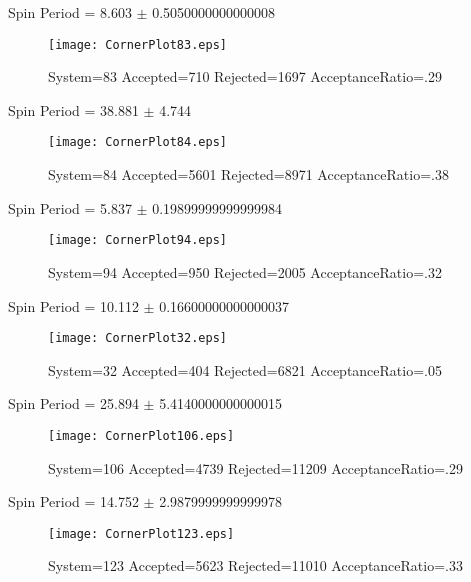 \documentclass[10pt]{article}
\begin{document}
\newpage
\begin{center}
        Spin Period = 8.603 $\pm$ 0.5050000000000008
        \end{center}
\begin{figure}[H] 
        \texttt{[image: CornerPlot83.eps]}
        \caption{System=83 Accepted=710 Rejected=1697 AcceptanceRatio=.29}
        \label{S83}
        \centering
        \end{figure}
\newpage
\begin{center}
        Spin Period = 38.881 $\pm$ 4.744
        \end{center}
\begin{figure}[H] 
        \texttt{[image: CornerPlot84.eps]}
        \caption{System=84 Accepted=5601 Rejected=8971 AcceptanceRatio=.38}
        \label{S84}
        \centering
        \end{figure}
\newpage
\begin{center}
        Spin Period = 5.837 $\pm$ 0.19899999999999984
        \end{center}
\begin{figure}[H] 
        \texttt{[image: CornerPlot94.eps]}
        \caption{System=94 Accepted=950 Rejected=2005 AcceptanceRatio=.32}
        \label{S94}
        \centering
        \end{figure}
\newpage
\begin{center}
        Spin Period = 10.112 $\pm$ 0.16600000000000037
        \end{center}
\begin{figure}[H] 
        \texttt{[image: CornerPlot32.eps]}
        \caption{System=32 Accepted=404 Rejected=6821 AcceptanceRatio=.05}
        \label{S32}
        \centering
        \end{figure}
\newpage
\begin{center}
        Spin Period = 25.894 $\pm$ 5.4140000000000015
        \end{center}
\begin{figure}[H] 
        \texttt{[image: CornerPlot106.eps]}
        \caption{System=106 Accepted=4739 Rejected=11209 AcceptanceRatio=.29}
        \label{S106}
        \centering
        \end{figure}
\newpage
\begin{center}
        Spin Period = 14.752 $\pm$ 2.9879999999999978
        \end{center}
\begin{figure}[H] 
        \texttt{[image: CornerPlot123.eps]}
        \caption{System=123 Accepted=5623 Rejected=11010 AcceptanceRatio=.33}
        \label{S123}
        \centering
        \end{figure}
\end{document}
